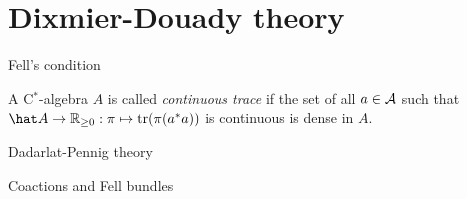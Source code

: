 \documentclass{../../large}
\begin{document}
\section{Dixmier-Douady theory}


Fell's condition

A C$^*$-algebra $A$ is called \emph{continuous trace} if the set of all $a\in\mathcal{A}$ such that $\hat A\to\R_{\ge0}:\pi\mapsto\tr(\pi(a^*a))$ is continuous is dense in $A$.



Dadarlat-Pennig theory


Coactions and Fell bundles
\end{document}
